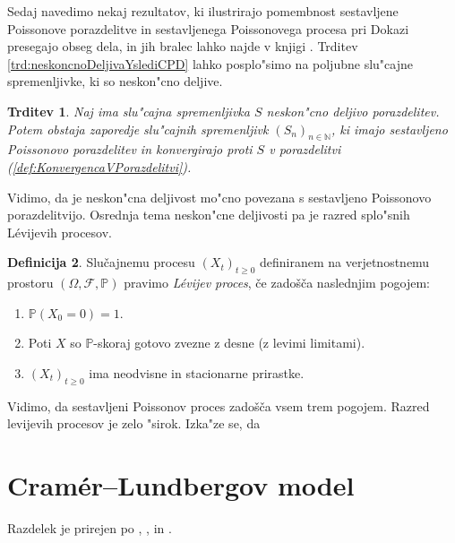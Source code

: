 \documentclass[12pt, a4paper, reqno]{amsart}
\theoremstyle{definition}
\newtheorem{definicija}{Definicija}[section]
\theoremstyle{plain}
\newtheorem{trditev}[definicija]{Trditev}
\newcommand{\N}{\mathbb{N}}
\newcommand{\Prob}{\mathbb{P}}
\newcommand{\1}{\mathds{1}}
\begin{document}
    Sedaj navedimo nekaj rezultatov, ki ilustrirajo pomembnost sestavljene Poissonove porazdelitve in 
    sestavljenega Poissonovega procesa pri  Dokazi presegajo obseg dela, in jih bralec lahko najde v knjigi 
    \cite{10}.
    Trditev \ref{trd:neskoncnoDeljivaYslediCPD} lahko posplo"simo na poljubne slu"cajne spremenljivke, ki
    so neskon"cno deljive.

    \begin{trditev}
        Naj ima slu"cajna spremenljivka $S$ neskon"cno deljivo porazdelitev. Potem obstaja zaporedje 
        slu"cajnih spremenljivk $(S_n)_{n\in\N}$, ki imajo sestavljeno Poissonovo porazdelitev in
        konvergirajo proti $S$ v porazdelitvi (\ref{def:KonvergencaVPorazdelitvi}).
    \end{trditev}

    Vidimo, da je neskon"cna deljivost mo"cno povezana s sestavljeno Poissonovo porazdelitvijo. Osrednja
    tema neskon"cne deljivosti pa je razred splo"snih Lévijevih procesov. 

    \begin{definicija}
        Slučajnemu procesu $(X_t)_{t\geq0}$ definiranem na verjetnostnemu
        prostoru $(\Omega, \mathcal{F}, \Prob)$ pravimo \textit{Lévijev proces}, če zadošča naslednjim pogojem:
        \begin{enumerate}
            \item $\Prob(X_0 = 0)=1$.
            \item Poti $X$ so $\Prob$-skoraj gotovo zvezne z desne (z levimi limitami).
            \item $(X_t)_{t\geq0}$ ima neodvisne in stacionarne prirastke.
        \end{enumerate}
    \end{definicija}

    Vidimo, da sestavljeni Poissonov proces zadošča vsem trem pogojem. Razred levijevih procesov 
    je zelo "sirok. Izka"ze se, da 

    \pagebreak

\section{Cramér--Lundbergov model}
    \noindent
    Razdelek je prirejen po \cite{3}, \cite{4},  \cite{5} in \cite{9}.
\end{document}
